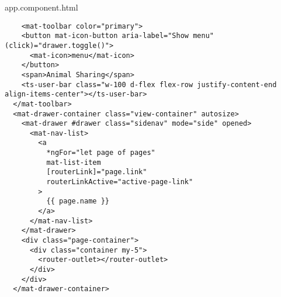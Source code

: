 app.component.html
\begin{lstlisting}
    <mat-toolbar color="primary">
    <button mat-icon-button aria-label="Show menu" (click)="drawer.toggle()">
      <mat-icon>menu</mat-icon>
    </button>
    <span>Animal Sharing</span>
    <ts-user-bar class="w-100 d-flex flex-row justify-content-end align-items-center"></ts-user-bar>
  </mat-toolbar>
  <mat-drawer-container class="view-container" autosize>
    <mat-drawer #drawer class="sidenav" mode="side" opened>
      <mat-nav-list>
        <a
          *ngFor="let page of pages"
          mat-list-item
          [routerLink]="page.link"
          routerLinkActive="active-page-link"
        >
          {{ page.name }}
        </a>
      </mat-nav-list>
    </mat-drawer>
    <div class="page-container">
      <div class="container my-5">
        <router-outlet></router-outlet>
      </div>
    </div>
  </mat-drawer-container>
\end{lstlisting}

